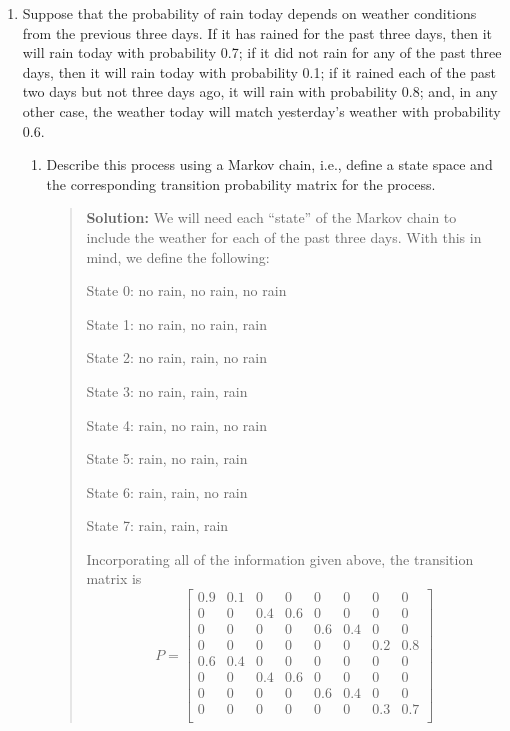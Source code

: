 \documentclass{article}
\begin{document}
\begin{enumerate}
\begin{enumerate}
  \end{enumerate} 

  \item Suppose that the probability of rain today depends on weather
  conditions from the previous three days. If it has rained for the
  past three days, then it will rain today with probability 0.7; if it
  did not rain for any of the past three days, then it will rain today
  with probability 0.1; if it rained each of the past two days but not three days
  ago, it will rain with probability 0.8; and, in any other case, the weather today will
  match yesterday's weather with probability 0.6.

  \begin{enumerate}
  
  \item Describe this process using a Markov chain, i.e., define a state space
  and the corresponding transition probability matrix for the process.
    \begin{quotation}{\bf Solution:}
    We will need each ``state'' of the Markov chain to include the weather for
    each of the past three days.  With this in mind, we define the following:
    
    State 0:  no rain, no rain, no rain

    State 1:  no rain, no rain, rain

    State 2:  no rain, rain, no rain

    State 3:  no rain, rain, rain

    State 4:  rain, no rain, no rain

    State 5:  rain, no rain, rain

    State 6:  rain, rain, no rain

    State 7:  rain, rain, rain
    
    Incorporating all of the information given above, the transition matrix is
    \[
    P = \begin{bmatrix}
    0.9 & 0.1 & 0 & 0 & 0 & 0 & 0 & 0 \\
    0 & 0 & 0.4 & 0.6 & 0 & 0 & 0 & 0 \\
    0 & 0 & 0 & 0 & 0.6 & 0.4 & 0 & 0 \\
    0 & 0 & 0 & 0 & 0 & 0 & 0.2 & 0.8 \\
    0.6 & 0.4 & 0 & 0 & 0 & 0 & 0 & 0 \\
    0 & 0 & 0.4 & 0.6 & 0 & 0 & 0 & 0 \\
    0 & 0 & 0 & 0 & 0.6 & 0.4 & 0 & 0 \\
    0 & 0 & 0 & 0 & 0 & 0 & 0.3 & 0.7 \\
    \end{bmatrix}
    \]
    \end{quotation}


\end{enumerate}
\end{enumerate}
\end{document}
